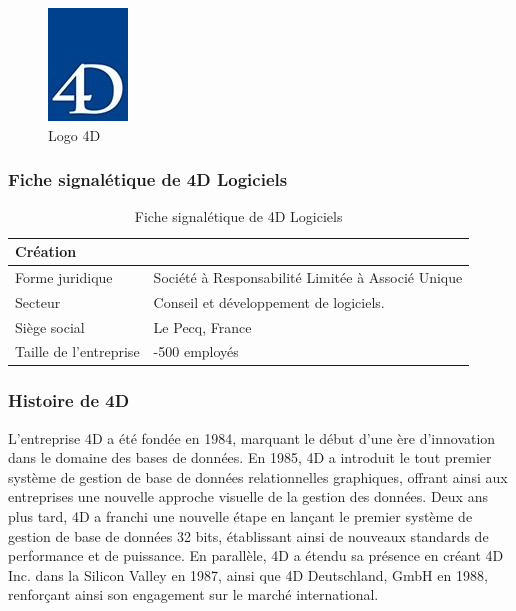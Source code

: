 \begin{figure}[h]
    \centering
    \includegraphics[scale=1]{Images/logo-4d.jpg} %
    \caption{Logo 4D}
    \label{fig:Logo4D}
\end{figure}


\subsubsection{Fiche signalétique de 4D Logiciels}


\begin{table}[h!]
    \centering
    \begin{tabular}{|>{\raggedright\arraybackslash}m{6cm}|>{\raggedright\arraybackslash}m{6cm}|}
    \hline
    Création & 1984 \\ 
    \hline
    Forme juridique & Société à Responsabilité Limitée à Associé Unique \\ 
    \hline
    Secteur & Conseil et développement de logiciels. \\ 
    \hline
    Siège social & Le Pecq, France \\ 
    \hline
    Taille de l’entreprise & 200-500 employés \\ 
    \hline
    \end{tabular}
    \caption{Fiche signalétique de 4D Logiciels}
    \label{tab:fiche_signaletique}
\end{table}


\subsubsection{Histoire de 4D}
L’entreprise 4D a été fondée en 1984, marquant le début d’une ère d’innovation dans le
domaine des bases de données. En 1985, 4D a introduit le tout premier système de gestion
de base de données relationnelles graphiques, offrant ainsi aux entreprises une nouvelle
approche visuelle de la gestion des données. Deux ans plus tard, 4D a franchi une nouvelle
étape en lançant le premier système de gestion de base de données 32 bits, établissant
ainsi de nouveaux standards de performance et de puissance. En parallèle, 4D a étendu
sa présence en créant 4D Inc. dans la Silicon Valley en 1987, ainsi que 4D Deutschland,
GmbH en 1988, renforçant ainsi son engagement sur le marché international.


